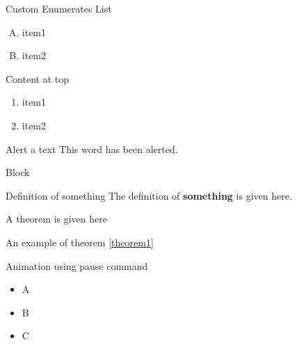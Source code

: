 \documentclass{beamer}
\begin{document}
{\begin{frame}{Custom Enumerates List}
\begin{enumerate}[(A)]
\item item1
\item item2
\end{enumerate}
\end{frame}

\begin{frame}[t]{Content at top} \vspace*{10pt}
\begin{enumerate}
	\item item1
	\item item2
\end{enumerate}
\end{frame}

\begin{frame}[t]{Alert a text} \vspace*{10pt}
This \alert{word} has been alerted.
\end{frame}

\begin{frame}[t]{Block} \vspace*{10pt}
\begin{block}{Definition of something}
The definition of \textbf{something} is given here.
\end{block}

\begin{theorem}
	\label{theorem1}
	A theorem is given here
\end{theorem}

\begin{example}
	An example of theorem \ref{theorem1} %
\end{example}

\end{frame}

\begin{frame}[t]{Animation using pause command} \vspace*{10pt}

\begin{itemize}
	\item A \pause
	\item B \pause
	\item C 
\end{itemize}


\end{frame}}
\end{document}
